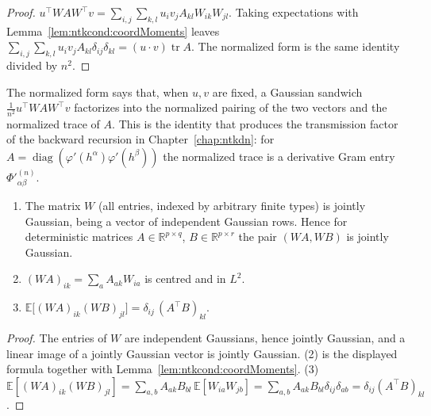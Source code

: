 \begin{proof}
  \leanok
$u^\top WAW^\top v=\sum_{i,j}\sum_{k,l}u_iv_jA_{kl}W_{ik}W_{jl}$. Taking expectations with Lemma~\ref{lem:ntkcond:coordMoments} leaves $\sum_{i,j}\sum_{k,l}u_iv_jA_{kl}\delta_{ij}\delta_{kl}=(u\cdot v)\operatorname{tr}A$. The normalized form is the same identity divided by $n^2$.
\end{proof}

The normalized form says that, when $u,v$ are fixed, a Gaussian sandwich $\tfrac1{n^2}u^\top WAW^\top v$ factorizes into the normalized pairing of the two vectors and the normalized trace of $A$. This is the identity that produces the transmission factor of the backward recursion in Chapter~\ref{chap:ntkdn}: for $A=\operatorname{diag}(\varphi'(h^\alpha)\varphi'(h^\beta))$ the normalized trace is a derivative Gram entry $\Phi'^{(n)}_{\alpha\beta}$.

\begin{lemma}\label{lem:ntkcond:linearImages}
  \leanok
\begin{enumerate}
  \item The matrix $W$ (all entries, indexed by arbitrary finite types) is jointly Gaussian, being a vector of independent Gaussian rows. Hence for deterministic matrices $A\in\mathbb R^{p\times q}$, $B\in\mathbb R^{p\times r}$ the pair $(WA,WB)$ is jointly Gaussian.
  \item $(WA)_{ik}=\sum_aA_{ak}W_{ia}$ is centred and in $L^2$.
  \item $\mathbb E\bigl[(WA)_{ik}(WB)_{jl}\bigr]=\delta_{ij}\,(A^\top B)_{kl}$.
\end{enumerate}
\end{lemma}

\begin{proof}
  \leanok
The entries of $W$ are independent Gaussians, hence jointly Gaussian, and a linear image of a jointly Gaussian vector is jointly Gaussian. (2) is the displayed formula together with Lemma~\ref{lem:ntkcond:coordMoments}. (3) $\mathbb E[(WA)_{ik}(WB)_{jl}]=\sum_{a,b}A_{ak}B_{bl}\,\mathbb E[W_{ia}W_{jb}]=\sum_{a,b}A_{ak}B_{bl}\delta_{ij}\delta_{ab}=\delta_{ij}(A^\top B)_{kl}$.
\end{proof}

